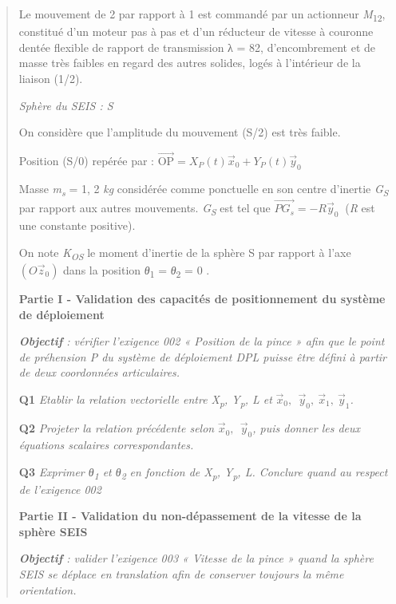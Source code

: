 \documentclass[]{article}
\begin{document}
\begin{quote}
Le mouvement de 2 par rapport à 1 est commandé par un actionneur
\emph{M}\textsubscript{12}, constitué d'un moteur pas à pas et d'un
réducteur de vitesse à couronne dentée flexible de rapport de
transmission λ = 82, d'encombrement et de masse très faibles en regard
des autres solides, logés à l'intérieur de la liaison (1/2).

\emph{Sphère du SEIS : S}

On considère que l'amplitude du mouvement (S/2) est très faible.

Position (S/0) repérée par :
\(\overrightarrow{\text{OP}} = X_{P}(t){\overrightarrow{x}}_{0} + Y_{P}(t){\overrightarrow{y}}_{0}\ \)

Masse \emph{m\textsubscript{s}} = 1, 2 \emph{kg} considérée comme
ponctuelle en son centre d'inertie \emph{G\textsubscript{S}} par rapport
aux autres mouvements. \emph{G\textsubscript{S}} est tel que
\(\overrightarrow{PG_{s}} = - R{\overrightarrow{y}}_{0}\ \) (\emph{R}
est une constante positive).

On note \emph{K\textsubscript{OS}} le moment d'inertie de la sphère S
par rapport à l'axe \(\left( O{\overrightarrow{z}}_{0} \right)\) dans la
position \emph{θ}\textsubscript{1} = \emph{θ}\textsubscript{2} = 0 .

\textbf{Partie I - Validation des capacités de positionnement du système
de déploiement}

\emph{\textbf{Objectif} : vérifier l'exigence 002 « Position de la pince
» afin que le point de préhension P du système de déploiement DPL puisse
être défini à partir de deux coordonnées articulaires.}

\textbf{Q1} \emph{Etablir la relation vectorielle entre
X\textsubscript{p}, Y\textsubscript{p}, L et}
\({\overrightarrow{x}}_{0},\ \ {\overrightarrow{y}}_{0},\ {\overrightarrow{x}}_{1},\ {\overrightarrow{y}}_{1}\)\emph{.}

\textbf{Q2} \emph{Projeter la relation précédente selon}
\({\overrightarrow{x}}_{0},\ \ {\overrightarrow{y}}_{0}\)\emph{, puis
donner les deux équations scalaires correspondantes.}

\textbf{Q3} \emph{Exprimer θ\textsubscript{1} et θ\textsubscript{2} en
fonction de X\textsubscript{p}, Y\textsubscript{p}, L. Conclure quand au
respect de l'exigence 002}

\textbf{Partie II - Validation du non-dépassement de la vitesse de la
sphère SEIS}

\emph{\textbf{Objectif} : valider l'exigence 003 « Vitesse de la pince »
quand la sphère SEIS se déplace en translation afin de conserver
toujours la même orientation.}


\end{quote}
\end{document}
